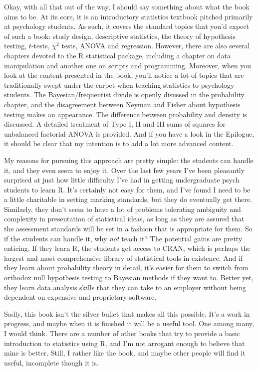 \documentclass[
]{book}
\begin{document}
Okay, with all that out of the way, I should say something about what the book aims to be. At its core, it is an introductory statistics textbook pitched primarily at psychology students. As such, it covers the standard topics that you'd expect of such a book: study design, descriptive statistics, the theory of hypothesis testing, \(t\)-tests, \(\chi^2\) tests, ANOVA and regression. However, there are also several chapters devoted to the R statistical package, including a chapter on data manipulation and another one on scripts and programming. Moreover, when you look at the content presented in the book, you'll notice a lot of topics that are traditionally swept under the carpet when teaching statistics to psychology students. The Bayesian/frequentist divide is openly disussed in the probability chapter, and the disagreement between Neyman and Fisher about hypothesis testing makes an appearance. The difference between probability and density is discussed. A detailed treatment of Type I, II and III sums of squares for unbalanced factorial ANOVA is provided. And if you have a look in the Epilogue, it should be clear that my intention is to add a lot more advanced content.

My reasons for pursuing this approach are pretty simple: the students can handle it, and they even seem to enjoy it. Over the last few years I've been pleasantly surprised at just how little difficulty I've had in getting undergraduate psych students to learn R. It's certainly not easy for them, and I've found I need to be a little charitable in setting marking standards, but they do eventually get there. Similarly, they don't seem to have a lot of problems tolerating ambiguity and complexity in presentation of statistical ideas,
as long as they are assured that the assessment standards will be set in a fashion that is appropriate for them. So if the students can handle it, why \emph{not} teach it? The potential gains are pretty enticing. If they learn R, the students get access to CRAN, which is perhaps the largest and most comprehensive library of statistical tools in existence. And if they learn about probability theory in detail, it's easier for them to switch from orthodox null hypothesis testing to Bayesian methods if they want to. Better yet, they learn data analysis skills that they can take to an employer without being dependent on expensive and proprietary software.

Sadly, this book isn't the silver bullet that makes all this possible. It's a work in progress, and maybe when it is finished it will be a useful tool. One among many, I would think. There are a number of other books that try to provide a basic introduction to statistics using R, and I'm not arrogant enough to believe that mine is better. Still, I rather like the book, and maybe other people will find it useful, incomplete though it is.
\end{document}
